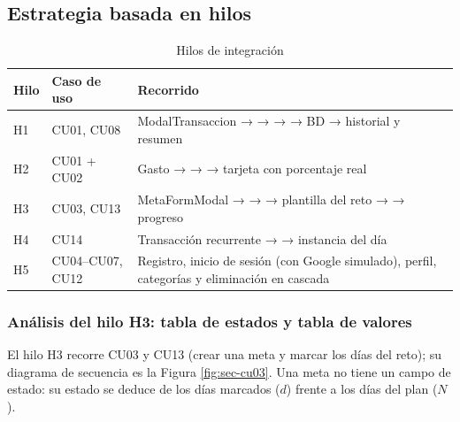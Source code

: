 \subsection{Estrategia basada en hilos}

\begin{table}[H]
\caption{Hilos de integración}
\label{tab:hilos}
\footnotesize
\begin{tabularx}{\linewidth}{L{1cm} L{2.2cm} Y}
\toprule
Hilo & Caso de uso & Recorrido \\
\midrule
H1 & CU01, CU08 & ModalTransaccion →  →  →  → BD → historial y resumen \\
H2 & CU01 + CU02 & Gasto →  →  → tarjeta con porcentaje real \\
H3 & CU03, CU13 & MetaFormModal →  →  → plantilla del reto →  → progreso \\
H4 & CU14 & Transacción recurrente →  → instancia del día \\
H5 & CU04–CU07, CU12 & Registro, inicio de sesión (con Google simulado), perfil, categorías y eliminación en cascada \\
\bottomrule
\end{tabularx}
\end{table}

\subsubsection{Análisis del hilo H3: tabla de estados y tabla de valores}

El hilo H3 recorre CU03 y CU13 (crear una meta y marcar los días del reto); su diagrama de secuencia es la Figura \ref{fig:sec-cu03}. Una meta no tiene un campo de estado: su estado se deduce de los días marcados ($d$) frente a los días del plan ($N$).

